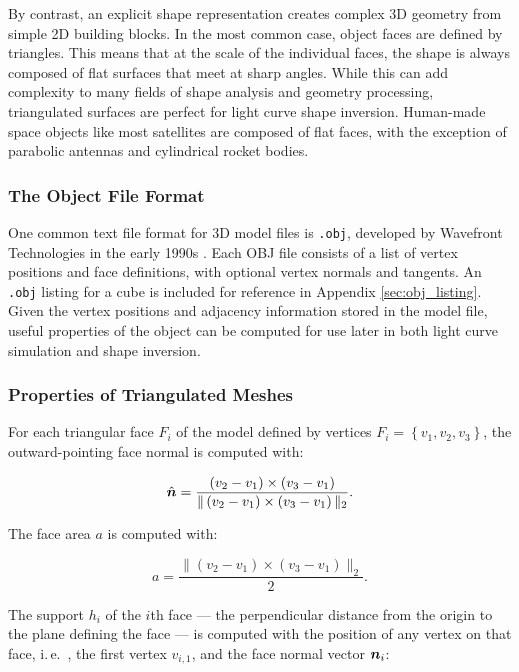 By contrast, an explicit shape representation creates complex 3D geometry from simple 2D building blocks. In the most common case, object faces are defined by triangles. This means that at the scale of the individual faces, the shape is always composed of flat surfaces that meet at sharp angles. While this can add complexity to many fields of shape analysis and geometry processing, triangulated surfaces are perfect for light curve shape inversion. Human-made space objects like most satellites are composed of flat faces, with the exception of parabolic antennas and cylindrical rocket bodies.

\subsubsection{The Object File Format}

One common text file format for 3D model files is \texttt{.obj}, developed by Wavefront Technologies in the early 1990s \cite{obj_format}. Each OBJ file consists of a list of vertex positions and face definitions, with optional vertex normals and tangents. An \texttt{.obj} listing for a cube is included for reference in Appendix \ref{sec:obj_listing}. Given the vertex positions and adjacency information stored in the model file, useful properties of the object can be computed for use later in both light curve simulation and shape inversion. 

\subsubsection{Properties of Triangulated Meshes}

For each triangular face $F_i$ of the model defined by vertices $F_i = \left\{v_1, v_2, v_3\right\}$, the outward-pointing face normal is computed with:

\begin{equation} \label{eq:face_normal}
    \hat{\bm{n}} = \frac{\left( v_2 - v_1 \right) \times \left( v_3 - v_1 \right)}{\| \left( v_2 - v_1 \right) \times \left( v_3 - v_1 \right) \|_2}.
\end{equation}

The face area $a$ is computed with:

\begin{equation} \label{eq:face_areas}
    a = \frac{\| \left( v_2 - v_1 \right) \times \left( v_3 - v_1 \right)\|_2}{2}.
\end{equation}

The support $h_i$ of the $i$th face --- the perpendicular distance from the origin to the plane defining the face --- is computed with the position of any vertex on that face, i.\,e.\ , the first vertex $v_{i,1}$, and the face normal vector $\bm{n}_i$:

